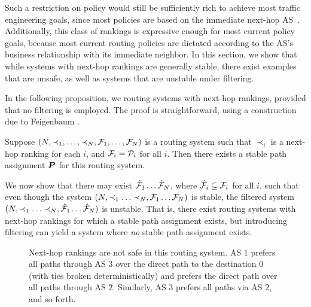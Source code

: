 Such a restriction on policy would still be sufficiently rich to achieve
most traffic engineering goals, since most policies are based on the
immediate next-hop AS~\cite{Feamster2003e}.  Additionally, this class of
rankings is expressive enough for most current policy goals,
because most current routing policies are dictated according to the AS's
business relationship with its immediate neighbor.  In this section,
we show that while systems with next-hop rankings are generally
stable, there exist examples that are unsafe, as well as systems that
are unstable under filtering.

In the following proposition, we routing systems with next-hop rankings,
provided that no filtering is employed.  The proof is straightforward,
using a construction due to Feigenbaum \ea\cite{Feigenbaum2004}.

\begin{prop}
Suppose $(N, \prec_1, \ldots, \prec_N, \mathcal{F}_1, \ldots, \mathcal{F}_N)$ is a
routing system such that $\prec_i$ is a next-hop ranking for each $i$,
and $\mathcal{F}_i = \mathcal{P}_i$ for all $i$.  Then there exists a stable path
assignment $\boldsymbol{P}$ for this routing system.
\end{prop}

We now show that there may exist 
$\hat{\mathcal{F}}_1 \ldots \hat{\mathcal{F}}_N$, where $\hat{\mathcal{F}}_i \subseteq \mathcal{F}_i$
for all $i$, such that even though the system $(N, \prec_1 \ldots
\prec_N, \mathcal{F}_1 \ldots \mathcal{F}_N)$ is stable, the filtered system $(N,
\prec_1 \ldots \prec_N, \hat{\mathcal{F}}_1 \ldots \hat{\mathcal{F}}_N)$ is
unstable.  That is, there exist routing systems with next-hop
rankings for which a stable path assignment exists, but introducing
filtering can yield a system where {\em no} stable path assignment exists.

\begin{figure}
\centering
{}\hfill 
%
\caption[Routing system with next-hop rankings that is not
  safe]{Next-hop rankings are not safe in this routing system.  AS 
$1$ prefers all paths through AS $3$ over the direct path to the
destination $0$ (with ties broken deterministically) and prefers the
direct path over all paths through AS $2$.  Similarly, AS $3$ prefers
all paths via AS $2$, and so forth.}
\label{fig:nexthop_osc}
\end{figure}

